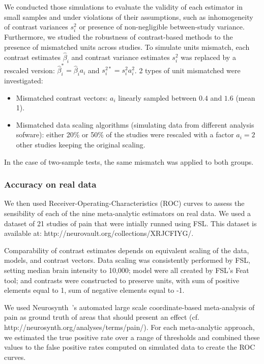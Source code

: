 \documentclass[preprint]{elsarticle}
\newcommand{\effectvector}{\hat\beta}
\newcommand{\effect}[1][i]{\effectvector_{#1}}
\newcommand{\effectunits}[1][i]{\effect[#1]^*}
\newcommand{\vareffect}[1][i]{s^2_{#1}}
\newcommand{\vareffectunits}[1][i]{s^{2*}_{#1}}
\begin{document}
We conducted those simulations to evaluate the validity of each estimator in small samples and under violations of their assumptions, such as inhomogeneity of contrast variances $\vareffect$ or presence of non-negligible between-study variance. Furthermore, we studied the robustness of contrast-based methods to the presence of mismatched units across studies. To simulate units mismatch, each contrast estimates $\effect$ and contrast variance estimates $\vareffect$ was replaced by a rescaled version: $\effectunits = \effect a_i$ and $\vareffectunits = \vareffect a_i^2$. 2 types of unit mismatched were investigated: 
\begin{itemize}
	\item Mismatched contrast vectors: $a_i$ linearly sampled between $0.4$ and $1.6$ (mean 1).
	\item Mismatched data scaling algorithms (simulating data from different analysis sofware): either 20\% or 50\% of the studies were rescaled with a factor $a_i = 2$ other studies keeping the original scaling.
\end{itemize}
In the case of two-sample tests, the same mismatch was applied to both groups.


\subsubsection{Accuracy on real data}
We then used Receiver-Operating-Characteristics (ROC) curves to assess the sensibility of each of the nine meta-analytic estimators on real data. We used a dataset of 21 studies of pain that were intially runned using FSL. This dataset is available at: http://neurovault.org/collections/XRJCFIYG/. 

Comparability of contrast estimates depends on equivalent scaling of the data, models, and contrast vectors. Data scaling was consistently performed by FSL, setting median brain intensity to 10,000; model were all created by FSL's Feat tool; and contrasts were constructed to preserve units, with sum of positive elements equal to 1, sum of negative elements equal to -1. 

We used Neurosynth~\cite{Yarkoni2011}'s automated large scale coordinate-based meta-analysis of pain as ground truth of areas that should present an effect (cf. http://neurosynth.org/analyses/terms/pain/). For each meta-analytic approach, we estimated the true positive rate over a range of thresholds and combined these values to the false positive rates computed on simulated data to create the ROC curves. 
\end{document}

